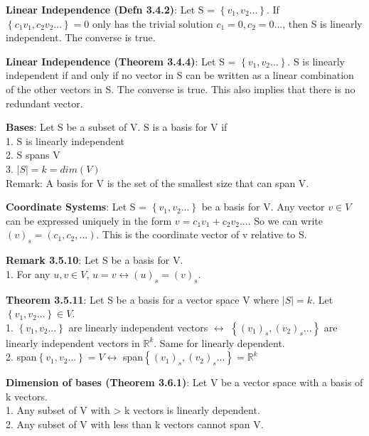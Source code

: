 \documentclass[a4paper,landscape]{article}
\newcommand{\rnname}[1]{\textbf{#1}}
\begin{document}
\begin{multicols*}{4}
\begin{flatitemize}
\item \rnname{Linear Independence (Defn 3.4.2)}: Let S =  $\left\lbrace v_{1}, v_{2} ... \right\rbrace$. If $\left\lbrace c_{1}v_{1}, c_{2}v_{2} ... \right\rbrace = 0 $ only has the trivial solution $ c_{1} = 0, c_{2} = 0 ... $, then S is linearly independent. The converse is true.
\item \rnname{Linear Independence (Theorem 3.4.4)}: Let S =  $\left\lbrace v_{1}, v_{2} ... \right\rbrace$. S is linearly independent if and only if no vector in S can be written as a linear combination of the other vectors in S. The converse is true. This also implies that there is no redundant vector.
\item \rnname{Bases}: Let S be a subset of V. S is a basis for V if \\
1. S is linearly independent\\
2. S spans V\\
3. $|S| = k = dim(V)$\\
Remark: A basis for V is the set of the smallest size that can span V.
\item \rnname{Coordinate Systems}: Let S = $\left\lbrace v_{1}, v_{2} ... \right\rbrace$ be a basis for V. Any vector $v \in V$ can be expressed uniquely in the form $v = c_{1}v_{1} + c_{2}v_{2} ... $. So we can write $(v)_{s} = \left(c_{1}, c_{2}, ...\right)$. This is the coordinate vector of v relative to S.
\item \rnname{Remark 3.5.10}: Let S be a basis for V.\\
1. For any $u,v \in V$, $u = v \leftrightarrow (u)_{s} = (v)_{s}$.
\item \rnname{Theorem 3.5.11}: Let S be a basis for a vector space V where $|S| = k$. Let $\left\lbrace v_{1}, v_{2} ... \right\rbrace \in V$.\\
1. $\left\lbrace v_{1}, v_{2} ... \right\rbrace$ are linearly independent vectors $\leftrightarrow$ $\left\lbrace (v_{1})_{s}, (v_{2})_{s} ... \right\rbrace$ are linearly independent vectors in $\mathbb{R}^{k}$. Same for linearly dependent.\\
2. span$\left\lbrace v_{1}, v_{2} ... \right\rbrace = V \leftrightarrow$ span$\left\lbrace (v_{1})_{s}, (v_{2})_{s} ... \right\rbrace = \mathbb{R}^k$
\item \rnname{Dimension of bases (Theorem 3.6.1)}: Let V be a vector space with a basis of k vectors. \\1. Any subset of V with > k vectors is linearly dependent.\\
2. Any subset of V with less than k vectors cannot span V.

\end{flatitemize}
\end{multicols*}
\end{document}
